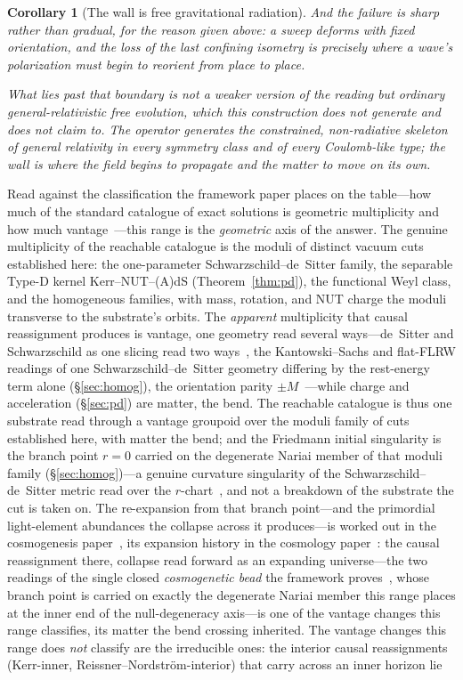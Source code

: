 \documentclass[11pt,a4paper]{article}
\newtheorem{corollary}[theorem]{Corollary}
\theoremstyle{definition}
\begin{document}
\begin{corollary}[The wall is free gravitational radiation]
\emph{And the failure is sharp rather than gradual}, for the reason given above: a sweep deforms with fixed orientation, and the loss of the last confining isometry is precisely where a wave's polarization must begin to reorient from place to place. 

\emph{What lies past that boundary is not a weaker version of the reading but ordinary general-relativistic free evolution}, which this construction does not generate and does not claim to. The operator generates the constrained, non-radiative skeleton of general relativity in every symmetry class and of every Coulomb-like type; the wall is where the field begins to propagate and the matter to move on its own.
\end{corollary}

\medskip
Read against the classification the framework paper places on the table---how much of the standard catalogue of exact solutions is geometric multiplicity and how much vantage~\cite{JanzenCRframework}---this range is the \emph{geometric} axis of the answer. The genuine multiplicity of the reachable catalogue is the moduli of distinct vacuum cuts established here: the one-parameter Schwarzschild--de~Sitter family, the separable Type-D kernel Kerr--NUT--(A)dS (Theorem~\ref{thm:pd}), the functional Weyl class, and the homogeneous families, with mass, rotation, and NUT charge the moduli transverse to the substrate's orbits. The \emph{apparent} multiplicity that causal reassignment produces is vantage, one geometry read several ways---de~Sitter and Schwarzschild as one slicing read two ways~\cite{JanzenSlicing}, the Kantowski--Sachs and flat-FLRW readings of one Schwarzschild--de~Sitter geometry differing by the rest-energy term alone (\S\ref{sec:homog}), the orientation parity $\pm M$~\cite{JanzenAlgebroid}---while charge and acceleration (\S\ref{sec:pd}) are matter, the bend. The reachable catalogue is thus one substrate read through a vantage groupoid over the moduli family of cuts established here, with matter the bend; and the Friedmann initial singularity is the branch point $r=0$ carried on the degenerate Nariai member of that moduli family (\S\ref{sec:homog})---a genuine curvature singularity of the Schwarzschild--de~Sitter metric read over the $r$-chart~\cite{JanzenCircle, JanzenCRcosmology}, and not a breakdown of the substrate the cut is taken on. The re-expansion from that branch point---and the primordial light-element abundances the collapse across it produces---is worked out in the cosmogenesis paper~\cite{JanzenCosmogenesis}, its expansion history in the cosmology paper~\cite{JanzenCRcosmology}: the causal reassignment there, collapse read forward as an expanding universe---the two readings of the single closed \emph{cosmogenetic bead} the framework proves~\cite{JanzenCRframework}, whose branch point is carried on exactly the degenerate Nariai member this range places at the inner end of the null-degeneracy axis---is one of the vantage changes this range classifies, its matter the bend crossing inherited. The vantage changes this range does \emph{not} classify are the irreducible ones: the interior causal reassignments (Kerr-inner, Reissner--Nordstr\"om-interior) that carry across an inner horizon lie 
\end{document}
